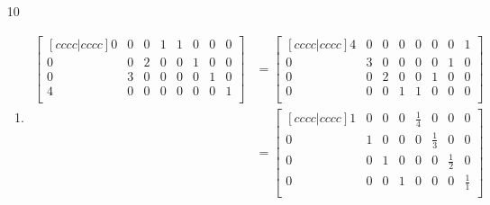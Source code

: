 \documentclass[12pt,letterpaper]{article}
\begin{document}
\begin{enumerate}
\begin{enumerate}
\begin{proof}
            \begin{align*}
              (A^2)^{-1} &= B \\
              (AA)^{-1} &= \\
              A^{-1}A^{-1} &= \\
              A^{-1} &= AB \\
            \end{align*}

            Thus, the inverse of $A$ is $AB$.
          \end{proof}
        \item [10]
          \begin{enumerate}[label=(\alph*)]
            \item

              \begin{align*}
                \begin{bmatrix}[c c c c | c c c c]
                   0 &  0 &  0 &  1 &  1 &  0 &  0 &  0 \\
                   0 &  0 &  2 &  0 &  0 &  1 &  0 &  0 \\
                   0 &  3 &  0 &  0 &  0 &  0 &  1 &  0 \\
                   4 &  0 &  0 &  0 &  0 &  0 &  0 &  1 \\
                \end{bmatrix}
                &=
                \begin{bmatrix}[c c c c | c c c c]
                   4 &  0 &  0 &  0 &  0 &  0 &  0 &  1 \\
                   0 &  3 &  0 &  0 &  0 &  0 &  1 &  0 \\
                   0 &  0 &  2 &  0 &  0 &  1 &  0 &  0 \\
                   0 &  0 &  0 &  1 &  1 &  0 &  0 &  0 \\
                \end{bmatrix}
                \\
                &=
                \begin{bmatrix}[c c c c | c c c c]
                    1 &  0 &  0 &  0 &  \frac{1}{4} &  0           &  0           &  0           \\
                    0 &  1 &  0 &  0 &  0           &  \frac{1}{3} &  0           &  0           \\
                    0 &  0 &  1 &  0 &  0           &  0           &  \frac{1}{2} &  0           \\
                    0 &  0 &  0 &  1 &  0           &  0           &  0           &  \frac{1}{1} \\
                \end{bmatrix}
                \\
              \end{align*}


\end{enumerate}
\end{enumerate}
\end{enumerate}
\end{document}
